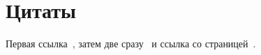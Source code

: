 \documentclass[12pt]{article}
\begin{document}
\section{Цитаты}

Первая ссылка~\cite{knuth2000}, затем две сразу~\cite{knuth2000,lamport1978}
и ссылка со страницей~\cite[с.~5]{knuth2000}.
\nocite{*}

\printbibliography
\end{document}
